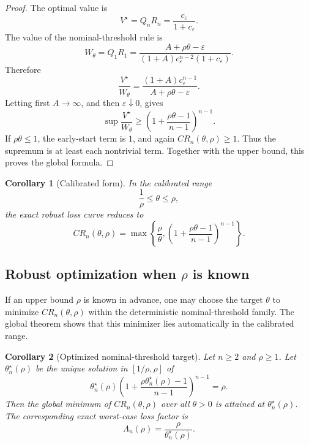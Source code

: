 \documentclass[11pt,a4paper]{article}
\newtheorem{corollary}{Corollary}
\begin{document}
\begin{proof}
The optimal value is
\[
  V^\star
  =
  Q_nR_n
  =
  \frac{c_\varepsilon}{1+c_\varepsilon}.
\]
The value of the nominal-threshold rule is
\[
  W_\theta
  =
  Q_1R_1
  =
  \frac{A+\rho\theta-\varepsilon}
       {(1+A)c_\varepsilon^{n-2}(1+c_\varepsilon)}.
\]
Therefore
\[
  \frac{V^\star}{W_\theta}
  =
  \frac{(1+A)c_\varepsilon^{n-1}}{A+\rho\theta-\varepsilon}.
\]
Letting first \(A\to\infty\), and then \(\varepsilon\downarrow0\), gives
\[
  \sup \frac{V^\star}{W_\theta}
  \ge
  \left(1+\frac{\rho\theta-1}{n-1}\right)^{n-1}.
\]
If \(\rho\theta\le1\), the early-start term is \(1\), and again
\(CR_n(\theta,\rho)\ge1\).  Thus the supremum is at least each nontrivial term.
Together with the upper bound, this proves the global formula.
\end{proof}

\begin{corollary}[Calibrated form]
\label{cor:calibrated-smoothness}
In the calibrated range
\[
  \frac1\rho\le\theta\le\rho,
\]
the exact robust loss curve reduces to
\[
  \boxed{
  CR_n(\theta,\rho)
  =
  \max\left\{
    \frac{\rho}{\theta},
    \left(1+\frac{\rho\theta-1}{n-1}\right)^{n-1}
  \right\}.
  }
  \tag{CR-cal}
\]
\end{corollary}

\subsection{Robust optimization when \(\rho\) is known}

If an upper bound \(\rho\) is known in advance, one may choose the target
\(\theta\) to minimize \(CR_n(\theta,\rho)\) within the deterministic
nominal-threshold family.  The global theorem shows that this minimizer lies
automatically in the calibrated range.

\begin{corollary}[Optimized nominal-threshold target]
\label{cor:optimized-threshold}
Let \(n\ge2\) and \(\rho\ge1\).  Let \(\theta_n^\star(\rho)\) be the unique
solution in \([1/\rho,\rho]\) of
\[
  \boxed{
  \theta_n^\star(\rho)
  \left(1+\frac{\rho\theta_n^\star(\rho)-1}{n-1}\right)^{n-1}
  =
  \rho.
  }
  \tag{2}
\]
Then the global minimum of \(CR_n(\theta,\rho)\) over all \(\theta>0\) is
attained at \(\theta_n^\star(\rho)\).  The corresponding exact worst-case loss
factor is
\[
  \boxed{
  \Lambda_n(\rho)=\frac{\rho}{\theta_n^\star(\rho)}.
  }
  \tag{4}
\]
\end{corollary}
\end{document}
